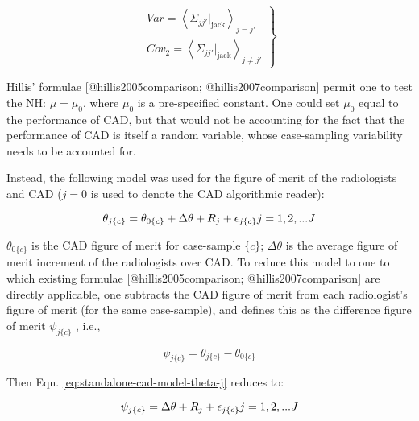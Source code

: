 \documentclass[
]{article}
\begin{document}
\begin{equation}
\left.
\begin{aligned}  
Var = \left \langle \Sigma_{jj'}|_{\text{jack}} \right \rangle_{j=j'}\\
Cov_2 = \left \langle \Sigma_{jj'}|_{\text{jack}} \right \rangle_{j \neq j'}
\end{aligned}
\right \}
\label{eq:standalone-cad-final-estimates-var-cov2}
\end{equation}

Hillis' formulae {[}@hillis2005comparison; @hillis2007comparison{]} permit one to test the NH: \(\mu = \mu_0\), where \(\mu_0\) is a pre-specified constant. One could set \(\mu_0\) equal to the performance of CAD, but that would not be accounting for the fact that the performance of CAD is itself a random variable, whose case-sampling variability needs to be accounted for.

Instead, the following model was used for the figure of merit of the radiologists and CAD (\(j = 0\) is used to denote the CAD algorithmic reader):

\begin{equation}
\theta_{j\{c\}} = \theta_{0\{c\}} + \Delta \theta + R_j + \epsilon_{j\{c\}}\\
j=1,2,...J
\label{eq:standalone-cad-model-theta-j}
\end{equation}

\(\theta_{0\{c\}}\) is the CAD figure of merit for case-sample \(\{c\}\); \(\Delta \theta\) is the average figure of merit increment of the radiologists over CAD. To reduce this model to one to which existing formulae {[}@hillis2005comparison; @hillis2007comparison{]} are directly applicable, one subtracts the CAD figure of merit from each radiologist's figure of merit (for the same case-sample), and defines this as the difference figure of merit \(\psi_{j\{c\}}\) , i.e.,

\begin{equation}
\psi_{j\{c\}} = \theta_{j\{c\}} - \theta_{0\{c\}}
\label{eq:standalone-cad-diff-reader-def}
\end{equation}

Then Eqn. \eqref{eq:standalone-cad-model-theta-j} reduces to:

\begin{equation}
\psi_{j\{c\}} = \Delta \theta + R_j + \epsilon_{j\{c\}}\\
j=1,2,...J
\label{eq:standalone-cad-model-psi-j}
\end{equation}
\end{document}
